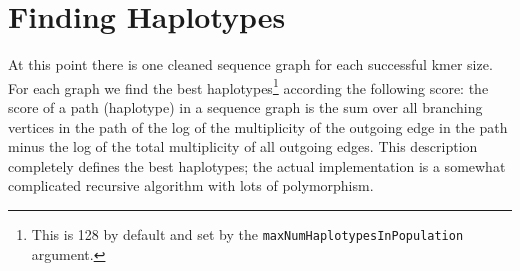 \documentclass[nofootinbib,amssymb,amsmath]{revtex4}
\newcommand{\code}[1]{\texttt{#1}}
\begin{document}
\section{Finding Haplotypes} \label{finding-haplotypes}
At this point there is one cleaned sequence graph for each successful kmer size.  For each graph we find the best haplotypes\footnote{This is 128 by default and set by the \code{maxNumHaplotypesInPopulation} argument.} according the following score: the score of a path (haplotype) in a sequence graph is the sum over all branching vertices in the path of the log of the multiplicity of the outgoing edge in the path minus the log of the total multiplicity of all outgoing edges.  This description completely defines the best haplotypes; the actual implementation is a somewhat complicated recursive algorithm with lots of polymorphism.
\end{document}
